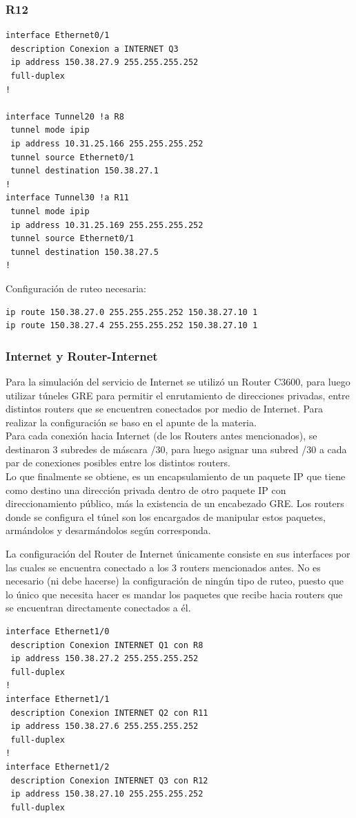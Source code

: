\subsubsection{R12}
\begin{verbatim}
interface Ethernet0/1
 description Conexion a INTERNET Q3
 ip address 150.38.27.9 255.255.255.252
 full-duplex
!

interface Tunnel20 !a R8
 tunnel mode ipip
 ip address 10.31.25.166 255.255.255.252
 tunnel source Ethernet0/1
 tunnel destination 150.38.27.1
!
interface Tunnel30 !a R11
 tunnel mode ipip
 ip address 10.31.25.169 255.255.255.252
 tunnel source Ethernet0/1
 tunnel destination 150.38.27.5
!
\end{verbatim}
Configuración de ruteo necesaria:
\begin{verbatim}
ip route 150.38.27.0 255.255.255.252 150.38.27.10 1
ip route 150.38.27.4 255.255.255.252 150.38.27.10 1
\end{verbatim}

\subsubsection{Internet y Router-Internet}
Para la simulación del servicio de Internet se utilizó un Router C3600, para luego utilizar túneles GRE para permitir el enrutamiento de direcciones privadas, entre distintos routers que se encuentren conectados por medio de Internet. Para realizar la configuración se baso en el apunte de la materia.\\
Para cada conexión hacia Internet (de los Routers antes mencionados), se destinaron 3 subredes de máscara /30, para luego asignar una subred /30 a cada par de conexiones posibles entre los distintos routers.\\
Lo que finalmente se obtiene, es un encapsulamiento de un paquete IP que tiene como destino una dirección privada dentro de otro paquete IP con direccionamiento público, más la existencia de un encabezado GRE. Los routers donde se configura el túnel son los encargados de manipular estos paquetes, armándolos y desarmándolos según corresponda.

La configuración del Router de Internet únicamente consiste en sus interfaces por las cuales se encuentra conectado a los 3 routers mencionados antes. No es necesario (ni debe hacerse) la configuración de ningún tipo de ruteo, puesto que lo único que necesita hacer es mandar los paquetes que recibe hacia routers que se encuentran directamente conectados a él.
\begin{verbatim}
interface Ethernet1/0
 description Conexion INTERNET Q1 con R8
 ip address 150.38.27.2 255.255.255.252
 full-duplex
!
interface Ethernet1/1
 description Conexion INTERNET Q2 con R11
 ip address 150.38.27.6 255.255.255.252
 full-duplex
!
interface Ethernet1/2
 description Conexion INTERNET Q3 con R12
 ip address 150.38.27.10 255.255.255.252
 full-duplex
\end{verbatim}


